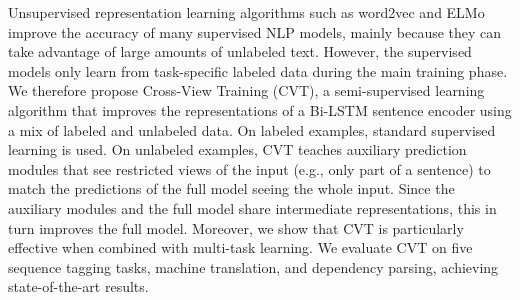 Unsupervised representation learning algorithms such as word2vec and ELMo improve the accuracy of many supervised NLP models, mainly because they can take advantage of large amounts of unlabeled text. However, the supervised models only learn from task-specific labeled data during the main training phase. We therefore propose Cross-View Training (CVT), a semi-supervised learning algorithm that improves the representations of a Bi-LSTM sentence encoder using a mix of labeled and unlabeled data. On labeled examples, standard supervised learning is used. On unlabeled examples, CVT teaches auxiliary prediction modules that see restricted views of the input (e.g., only part of a sentence) to match the predictions of the full model seeing the whole input. Since the auxiliary modules and the full model share intermediate representations, this in turn improves the full model. Moreover, we show that CVT is particularly effective when combined with multi-task learning. We evaluate CVT on five sequence tagging tasks, machine translation, and dependency parsing, achieving state-of-the-art results.
